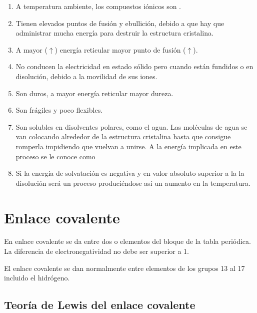 \begin{enumerate}[label=\numberballmDarkTeal]
        \item A temperatura ambiente, los compuestos iónicos son .
        \item Tienen elevados puntos de fusión y ebullición, debido a que hay que administrar mucha energía para destruir la estructura cristalina.
        \item A mayor ($\uparrow$) energía reticular mayor punto de fusión ($\uparrow$).
        \item No conducen la electricidad en estado sólido pero  cuando están fundidos o en disolución, debido a la movilidad de sus iones.
        \item Son duros, a mayor energía reticular mayor dureza.
        \item Son frágiles y poco flexibles.
        \item Son solubles en disolventes polares, como el agua.
        Las moléculas de agua se van colocando alrededor de la estructura cristalina hasta que consigue romperla impidiendo que vuelvan a unirse.
        A la energía implicada en este proceso se le conoce como 
        \item Si la energía de solvatación es negativa y en valor absoluto superior a la  la disolución será un proceso  produciéndose así un aumento en la temperatura.
\end{enumerate}


\section{Enlace covalente}

En enlace covalente se da entre dos  o elementos del bloque  de la tabla periódica.
La diferencia de electronegatividad no debe ser superior a 1.

El enlace covalente se dan normalmente entre elementos de los grupos 13 al 17 incluido el hidrógeno.

\subsection{Teoría de Lewis del enlace covalente}



